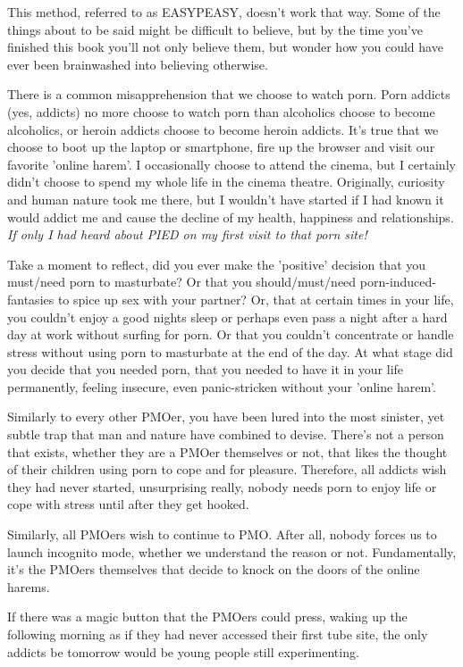 \documentclass[easypeasy.tex]{subfiles}
\begin{document}
This method, referred to as EASYPEASY, doesn't work that way. Some of the things about to be said might be difficult to believe, but by the time you've finished this book you'll not only believe them, but wonder how you could have ever been brainwashed into believing otherwise.

There is a common misapprehension that we choose to watch porn. Porn addicts (yes, addicts) no more choose to watch porn than alcoholics choose to become alcoholics, or heroin addicts choose to become heroin addicts. It's true that we choose to boot up the laptop or smartphone, fire up the browser and visit our favorite 'online harem'. I occasionally choose to attend the cinema, but I certainly didn't choose to spend my whole life in the cinema theatre. Originally, curiosity and human nature took me there, but I wouldn't have started if I had known it would addict me and cause the decline of my health, happiness and relationships.
\textit{If only I had heard about PIED on my first visit to that porn site!}

Take a moment to reflect, did you ever make the 'positive' decision that you must/need porn to masturbate? Or that you should/must/need porn-induced-fantasies to spice up sex with your partner? Or, that at certain times in your life, you couldn't enjoy a good nights sleep or perhaps even pass a night after a hard day at work without surfing for porn. Or that you couldn't concentrate or handle stress without using porn to masturbate at the end of the day. At what stage did you decide that you needed porn, that you needed to have it in your life permanently, feeling insecure, even panic-stricken without  your 'online harem'.

Similarly to every other PMOer, you have been lured into the most sinister, yet subtle trap that man and nature have combined to devise. There's not a person that exists, whether they are a PMOer themselves or not, that likes the thought of their children using porn to cope and for pleasure. Therefore, all addicts wish they had never started, unsurprising really, nobody needs porn to enjoy life or cope with stress until after they get hooked.

Similarly, all PMOers wish to continue to PMO. After all, nobody forces us to launch incognito mode, whether we understand the reason or not. Fundamentally, it's the PMOers themselves that decide to knock on the doors of the online harems.

If there was a magic button that the PMOers could press, waking up the following morning as if they had never accessed their first tube site, the only addicts be tomorrow would be young people still experimenting.
\end{document}
